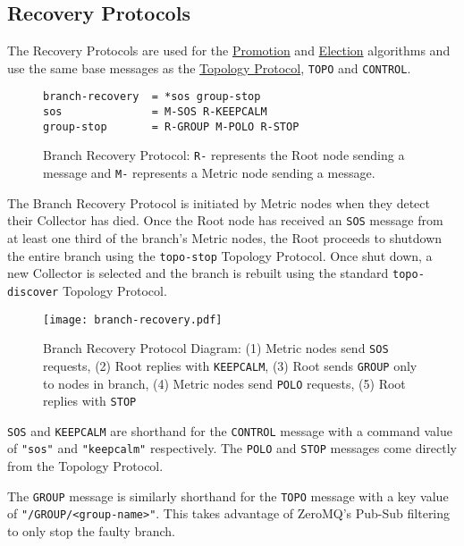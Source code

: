 \subsection{Recovery Protocols}
\label{proto_reco}

The \dcamp Recovery Protocols are used for the \hyperref[algor_promo]{Promotion} and \hyperref[algor_elect]{Election}
algorithms and use the same base messages as the \hyperref[proto_topo]{Topology Protocol}, \texttt{TOPO} and
\texttt{CONTROL}.

\begin{figure}[H]
\vspace{+10pt}
\begin{verbatim}
branch-recovery  = *sos group-stop
sos              = M-SOS R-KEEPCALM
group-stop       = R-GROUP M-POLO R-STOP
\end{verbatim}
\vspace{-5pt}
\caption[Branch Recovery Protocol]
	{Branch Recovery Protocol: \texttt{R-} represents the Root node sending a message and \texttt{M-} represents a
	 Metric node sending a message.}
\label{fig:proto_reco_branch_spec}
\end{figure}

The Branch Recovery Protocol is initiated by Metric nodes when they detect their Collector has died. Once the Root node
has received an \texttt{SOS} message from at least one third of the branch's Metric nodes, the Root proceeds to shutdown
the entire branch using the \texttt{topo-stop} Topology Protocol. Once shut down, a new Collector is selected and the
branch is rebuilt using the standard \texttt{topo-discover} Topology Protocol.

\begin{figure}[H]
    \centering
    \texttt{[image: branch-recovery.pdf]}
    \label{fig:proto_branch_reco_image}
    \caption[Branch Recovery Protocol Diagram]
            {Branch Recovery Protocol Diagram: (1) Metric nodes send \texttt{SOS} requests, (2) Root replies with
	     \texttt{KEEPCALM}, (3) Root sends \texttt{GROUP} only to nodes in branch, (4) Metric nodes send
	     \texttt{POLO} requests, (5) Root replies with \texttt{STOP}}
\end{figure}

\texttt{SOS} and \texttt{KEEPCALM} are shorthand for the \texttt{CONTROL} message with a command value of \texttt{"sos"}
and \texttt{"keepcalm"} respectively. The \texttt{POLO} and \texttt{STOP} messages come directly from the Topology
Protocol.

The \texttt{GROUP} message is similarly shorthand for the \texttt{TOPO} message with a key value of
\texttt{"/GROUP/<group-name>"}. This takes advantage of ZeroMQ's Pub-Sub filtering to only stop the faulty branch.


